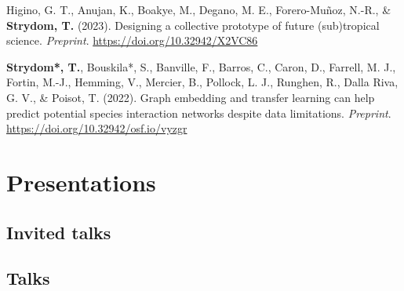 \documentclass[11pt,a4paper,]{awesome-cv}
\newlength{\cslhangindent}
\newenvironment{CSLReferences}[2] %
 {%
  \setlength{\parindent}{0pt}
  \ifodd #1 \everypar{\setlength{\hangindent}{\cslhangindent}}\ignorespaces\fi
  \ifnum #2 > 0
  \setlength{\parskip}{#2\baselineskip}
  \fi
 }%
 {}
\begin{document}
\hypertarget{refs-review}{}
\begin{CSLReferences}{1}{0}
\leavevmode{}%
Higino, G. T., Anujan, K., Boakye, M., Degano, M. E., Forero-Muñoz,
N.-R., \& \textbf{Strydom, T.} (2023). Designing a collective prototype
of future (sub)tropical science. \emph{Preprint}.
\url{https://doi.org/10.32942/X2VC86}

\leavevmode{}%
\textbf{Strydom*, T.}, Bouskila*, S., Banville, F., Barros, C., Caron,
D., Farrell, M. J., Fortin, M.-J., Hemming, V., Mercier, B., Pollock, L.
J., Runghen, R., Dalla Riva, G. V., \& Poisot, T. (2022). Graph
embedding and transfer learning can help predict potential species
interaction networks despite data limitations. \emph{Preprint}.
\url{https://doi.org/10.32942/osf.io/vyzgr}

\end{CSLReferences}

\hypertarget{presentations}{%
\section{Presentations}\label{presentations}}

\vspace{\baselineskip}

\hypertarget{invited-talks}{%
\subsection{\texorpdfstring{\textbf{Invited
talks}}{Invited talks}}\label{invited-talks}}

\begin{cventries}
    \vspace{-4.0mm}
    \vspace{-4.0mm}
    \vspace{-4.0mm}
\end{cventries}
\vspace{\baselineskip}

\hypertarget{talks}{%
\subsection{\texorpdfstring{\textbf{Talks}}{Talks}}\label{talks}}
\end{document}
